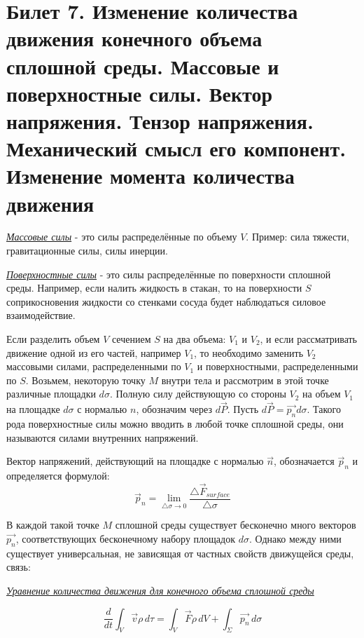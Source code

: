\newpage
\section{Билет 7. Изменение количества движения конечного объема сплошной среды. Массовые и поверхностные силы. Вектор напряжения. Тензор напряжения. Механический смысл его компонент. Изменение момента количества движения}

\textit{\underline{Массовые силы}} - это силы распределённые по объему $V$. Пример: сила тяжести, гравитационные силы, силы инерции.

\textit{\underline{Поверхностные силы}} - это силы распределённые по поверхности сплошной среды. Например, если налить жидкость в стакан, то на поверхности $S$ соприкосновения жидкости со стенками сосуда будет наблюдаться силовое взаимодействие.

Если разделить объем $V$ сечением $S$ на два объема: $V_1$ и $V_2$, и если рассматривать движение одной из его частей, например $V_1$, то необходимо заменить $V_2$ массовыми силами, распределенными по $V_1$ и поверхностными, распределенными по $S$. Возьмем, некоторую точку $M$ внутри тела и рассмотрим в этой точке различные площадки $d\sigma$. Полную силу действующую со стороны $V_2$ на объем $V_1$ на площадке $d\sigma$ с нормалью $n$, обозначим через $d\vec{P}$. Пусть $d\vec{P} = \vec{p_n}d\sigma$. Такого рода поверхностные силы можно вводить в любой точке сплошной среды, они называются силами внутренних напряжений. 

Вектор напряжений, действующий на площадке с нормалью $\vec{n}$, обозначается $\vec{p}_n$ и определяется формулой: $$\vec{p}_n = \lim_{\triangle \sigma \to 0} \frac{\triangle \vec{F}_{surface}}{\triangle \sigma}$$

В каждой такой точке $M$ сплошной среды существует бесконечно много векторов $\vec{p_n}$, соответствующих бесконечному набору площадок $d\sigma$. Однако между ними существует универсальная, не зависящая от частных свойств движущейся среды, связь:

\begin{center}
    \textit{\underline{Уравнение количества движения для конечного объема сплошной среды}}
\end{center}
$$
\frac{d}{dt}  \int_{V} \vec{v} \rho \,d\tau =  \int_{V} \vec{F} \rho \,dV  + \int_{\Sigma} \vec{p_n} \,d\sigma
$$


